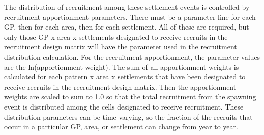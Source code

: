 The distribution of recruitment among these settlement events is controlled by recruitment apportionment parameters. There must be a parameter line for each GP, then for each area, then for each settlement.  All of these are required, but only those GP x area x settlements designated to receive recruits in the recruitment design matrix will have the parameter used in the recruitment distribution calculation.  For the recruitment apportionment, the parameter values are the ln(apportionment weight).  The sum of all apportionment weights is calculated for each pattern x area x settlements that have been designated to receive recruits in the recruitment design matrix.  Then the apportionment weights are scaled to sum to 1.0 so that the total recruitment from the spawning event is distributed among the cells designated to receive recruitment. These distribution parameters can be time-varying, so the fraction of the recruits that occur in a particular GP, area, or settlement can change from year to year. 

